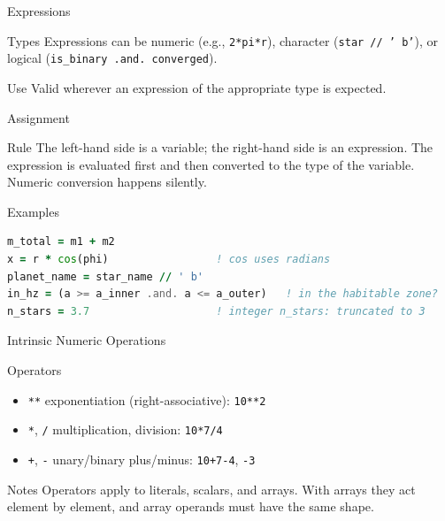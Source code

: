 \begin{frame}{Expressions}
  \begin{block}{Types}
  Expressions can be numeric (e.g., \texttt{2*pi*r}), character (\texttt{star // ' b'}), or logical (\texttt{is\_binary .and. converged}).
  \end{block}
  \begin{block}{Use}
  Valid wherever an expression of the appropriate type is expected.
  \end{block}
\end{frame}

\begin{frame}[fragile]{Assignment}
  \begin{block}{Rule}
  The left-hand side is a variable; the right-hand side is an expression. The expression is evaluated first and then converted to the type of the variable. Numeric conversion happens silently.
  \end{block}
  \begin{block}{Examples}
\begin{lstlisting}[language=Fortran]
m_total = m1 + m2
x = r * cos(phi)                 ! cos uses radians
planet_name = star_name // ' b'
in_hz = (a >= a_inner .and. a <= a_outer)   ! in the habitable zone?
n_stars = 3.7                    ! integer n_stars: truncated to 3
\end{lstlisting}
  \end{block}
\end{frame}

\begin{frame}{Intrinsic Numeric Operations}
  \begin{block}{Operators}
  \begin{itemize}
    \item \texttt{**} exponentiation (right-associative): \texttt{10**2}
    \item \texttt{*}, \texttt{/} multiplication, division: \texttt{10*7/4}
    \item \texttt{+}, \texttt{-} unary/binary plus/minus: \texttt{10+7-4}, \texttt{-3}
  \end{itemize}
  \end{block}
  \begin{block}{Notes}
  Operators apply to literals, scalars, and arrays. With arrays they act element by element, and array operands must have the same shape.
  \end{block}
\end{frame}

